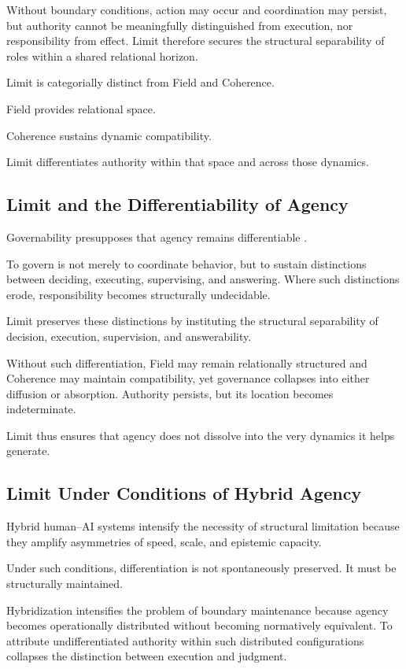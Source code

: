 \documentclass[12pt]{article}
\begin{document}
Without boundary conditions, action may occur and coordination may persist, but authority cannot be meaningfully distinguished from execution, nor responsibility from effect. Limit therefore secures the structural separability of roles within a shared relational horizon.

Limit is categorially distinct from Field and Coherence.

Field provides relational space.

Coherence sustains dynamic compatibility.

Limit differentiates authority within that space and across those dynamics.

\subsection{Limit and the Differentiability of Agency}


Governability presupposes that agency remains differentiable \citep{Ostrom1990}.

To govern is not merely to coordinate behavior, but to sustain distinctions between deciding, executing, supervising, and answering. Where such distinctions erode, responsibility becomes structurally undecidable.

Limit preserves these distinctions by instituting the structural separability of decision, execution, supervision, and answerability.

Without such differentiation, Field may remain relationally structured and Coherence may maintain compatibility, yet governance collapses into either diffusion or absorption. Authority persists, but its location becomes indeterminate.

Limit thus ensures that agency does not dissolve into the very dynamics it helps generate.

\subsection{Limit Under Conditions of Hybrid Agency}


Hybrid human–AI systems intensify the necessity of structural limitation because they amplify asymmetries of speed, scale, and epistemic capacity.

Under such conditions, differentiation is not spontaneously preserved. It must be structurally maintained.

Hybridization intensifies the problem of boundary maintenance because agency becomes operationally distributed without becoming normatively equivalent. To attribute undifferentiated authority within such distributed configurations collapses the distinction between execution and judgment.
\end{document}
